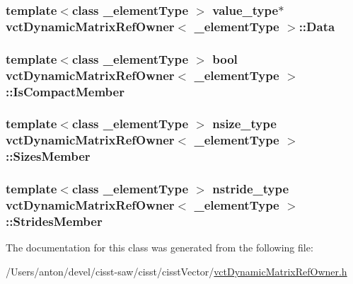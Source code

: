 \subsubsection[{Data}]{\setlength{\rightskip}{0pt plus 5cm}template$<$class \+\_\+element\+Type $>$ value\+\_\+type$\ast$ {\bf vct\+Dynamic\+Matrix\+Ref\+Owner}$<$ \+\_\+element\+Type $>$\+::Data\hspace{0.3cm}{\ttfamily [protected]}}\label{classvct_dynamic_matrix_ref_owner_a465f02e69e93e00a9fd586e4d89b6850}
\hypertarget{classvct_dynamic_matrix_ref_owner_a80b9ceef73131dead623c3e86f4f22a4}{}
\subsubsection[{Is\+Compact\+Member}]{\setlength{\rightskip}{0pt plus 5cm}template$<$class \+\_\+element\+Type $>$ bool {\bf vct\+Dynamic\+Matrix\+Ref\+Owner}$<$ \+\_\+element\+Type $>$\+::Is\+Compact\+Member\hspace{0.3cm}{\ttfamily [protected]}}\label{classvct_dynamic_matrix_ref_owner_a80b9ceef73131dead623c3e86f4f22a4}
\hypertarget{classvct_dynamic_matrix_ref_owner_a5b7725d1ef65ac16c0360b94c09f4a01}{}
\subsubsection[{Sizes\+Member}]{\setlength{\rightskip}{0pt plus 5cm}template$<$class \+\_\+element\+Type $>$ nsize\+\_\+type {\bf vct\+Dynamic\+Matrix\+Ref\+Owner}$<$ \+\_\+element\+Type $>$\+::Sizes\+Member\hspace{0.3cm}{\ttfamily [protected]}}\label{classvct_dynamic_matrix_ref_owner_a5b7725d1ef65ac16c0360b94c09f4a01}
\hypertarget{classvct_dynamic_matrix_ref_owner_a90a7ffe471468b4df2e172b824e54b18}{}
\subsubsection[{Strides\+Member}]{\setlength{\rightskip}{0pt plus 5cm}template$<$class \+\_\+element\+Type $>$ nstride\+\_\+type {\bf vct\+Dynamic\+Matrix\+Ref\+Owner}$<$ \+\_\+element\+Type $>$\+::Strides\+Member\hspace{0.3cm}{\ttfamily [protected]}}\label{classvct_dynamic_matrix_ref_owner_a90a7ffe471468b4df2e172b824e54b18}


The documentation for this class was generated from the following file\+:\begin{DoxyCompactItemize}
\item 
/\+Users/anton/devel/cisst-\/saw/cisst/cisst\+Vector/\hyperlink{vct_dynamic_matrix_ref_owner_8h}{vct\+Dynamic\+Matrix\+Ref\+Owner.\+h}\end{DoxyCompactItemize}
